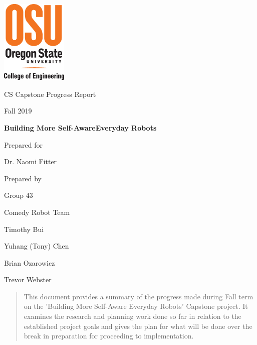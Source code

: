 \documentclass[onecolumn, draftclsnofoot,10pt, compsoc]{IEEEtran}
\def \CapstoneTeamName{		    Comedy Robot Team}
\def \CapstoneTeamNumber{		43}
\def \GroupMemberOne{			Timothy Bui}
\def \GroupMemberTwo{			Yuhang (Tony) Chen}
\def \GroupMemberThree{			Brian Ozarowicz}
\def \GroupMemberFour{			Trevor Webster}
\def \CapstoneProjectName{		Building More Self-Aware\linebreak Everyday Robots}
\def \CapstoneSponsorCompany{	SHARE Lab}
\def \CapstoneSponsorPerson{	Dr. Naomi Fitter}
\def \DocType{	%
				Progress Report
				}
\newcommand{\NameSigPair}[1]{\par
\makebox[2.75in][r]{#1} \hfil 	\makebox[3.25in]{\makebox[2.25in]{\hrulefill} \hfill		\makebox[.75in]{\hrulefill}}
\par\vspace{-12pt} \textit{\tiny\noindent
\makebox[2.75in]{} \hfil		\makebox[3.25in]{\makebox[2.25in][r]{Signature} \hfill	\makebox[.75in][r]{Date}}}}
\renewcommand{\NameSigPair}[1]{#1}
\begin{document}
\begin{titlepage}
    \begin{singlespace}
    	\includegraphics[height=4cm]{coe_v_spot1}
        \hfill 
        \par\vspace{.2in}
        \centering
        \scshape{
            \huge CS Capstone \DocType \par
            {\large Fall 2019}\par
            \vspace{.5in}
            \textbf{\Huge\CapstoneProjectName}\par
            \vfill
            {\large Prepared for}\par
            {\Large\NameSigPair{\CapstoneSponsorPerson}\par}
            {\large Prepared by }\par
            Group\CapstoneTeamNumber\par
            \CapstoneTeamName\par 
            \vspace{5pt}
            {\Large
                \NameSigPair{\GroupMemberOne}\par
                \NameSigPair{\GroupMemberTwo}\par
                \NameSigPair{\GroupMemberThree}\par
                \NameSigPair{\GroupMemberFour}\par
            }
            \vspace{20pt}
        }
        \begin{abstract}
        	\noindent This document provides a summary of the progress made during Fall term on the 'Building More Self-Aware Everyday Robots' Capstone project. It examines the research and planning work done so far in relation to the established project goals and gives the plan for what will be done over the break in preparation for proceeding to implementation.
        \end{abstract}
    \end{singlespace}
\end{titlepage}
\newpage
{}
\tableofcontents
\clearpage
\end{document}
